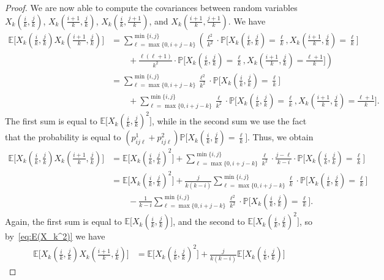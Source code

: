 \documentclass[10pt,a4paper]{amsart}
\newcommand{\EE}{\mathbb{E}}
\newcommand{\PP}{\mathbb{P}}
\begin{document}
\begin{proof}
We are now able to compute the covariances between random variables $X_k(\tfrac{i}{k},\tfrac{j}{k})$, $X_k(\tfrac{i+1}{k},\tfrac{j}{k})$, $X_k(\tfrac{i}{k},\tfrac{j+1}{k})$, and $X_k(\tfrac{i+1}{k},\tfrac{j+1}{k})$.
We have
\begin{align*}
    \EE\big[X_k(\tfrac{i}{k},\tfrac{j}{k})X_k(\tfrac{i+1}{k},\tfrac{j}{k})\big] &= \sum_{\ell=\max \{0,  i+j-k \}}^{\min \{i,j \}} \left(\frac{\ell^2}{k^2}\cdot \PP\big[X_k(\tfrac{i}{k},\tfrac{j}{k}) = \tfrac{\ell}{k}, X_k(\tfrac{i+1}{k},\tfrac{j}{k}) = \tfrac{\ell}{k}\big] \right.\\
    & \left.\qquad + \frac{\ell(\ell+1)}{k^2}\cdot \PP\big[X_k(\tfrac{i}{k},\tfrac{j}{k}) = \tfrac{\ell}{k}, X_k(\tfrac{i+1}{k},\tfrac{j}{k})= \tfrac{\ell+1}{k}\big]\right)\\
    &= \sum_{\ell=\max \{0,  i+j-k \}}^{\min \{i,j \}} \frac{\ell^2}{k^2}\cdot \PP\big[X_k(\tfrac{i}{k},\tfrac{j}{k}) = \tfrac{\ell}{k}\big] \\
    & \qquad + \sum_{\ell=\max \{0,  i+j-k \}}^{\min \{i,j \}} \frac{\ell}{k^2}\cdot \PP\big[X_k(\tfrac{i}{k},\tfrac{j}{k}) = \tfrac{\ell}{k}, X_k(\tfrac{i+1}{k},\tfrac{j}{k})= \tfrac{\ell+1}{k}\big].
\end{align*}
The first sum is equal to $\EE\big[X_k(\tfrac{i}{k},\tfrac{j}{k})^2\big]$, while in the second sum we use the fact that the probability is equal to $(p_{ij\ell}^1 + p_{ij\ell}^2)\PP\big[X_k(\tfrac{i}{k},\tfrac{j}{k}) = \tfrac{\ell}{k}\big]$.
Thus, we obtain
\begin{align*}
    \EE\big[X_k(\tfrac{i}{k},\tfrac{j}{k})X_k(\tfrac{i+1}{k},\tfrac{j}{k})\big] &= \EE\big[X_k(\tfrac{i}{k},\tfrac{j}{k})^2\big] + \sum_{\ell=\max \{0,  i+j-k \}}^{\min \{i,j \}} \frac{\ell}{k^2}\cdot \frac{j-\ell}{k-i}\cdot \PP\big[X_k(\tfrac{i}{k},\tfrac{j}{k}) = \tfrac{\ell}{k}\big]\\
    &= \EE\big[X_k(\tfrac{i}{k},\tfrac{j}{k})^2\big] + \frac{j}{k(k-i)}\sum_{\ell=\max \{0,  i+j-k \}}^{\min \{i,j \}} \frac{\ell}{k}\cdot \PP\big[X_k(\tfrac{i}{k},\tfrac{j}{k}) = \tfrac{\ell}{k}\big] \\
    & \qquad - \frac{1}{k-i}\sum_{\ell=\max \{0,  i+j-k \}}^{\min \{i,j \}} \frac{\ell^2}{k^2}\cdot \PP\big[X_k(\tfrac{i}{k},\tfrac{j}{k}) = \tfrac{\ell}{k}\big].
\end{align*}
Again, the first sum is equal to $\EE\big[X_k(\tfrac{i}{k},\tfrac{j}{k})\big]$, and the second to $\EE\big[X_k(\tfrac{i}{k},\tfrac{j}{k})^2\big]$, so by~\eqref{eq:E(X_k^2)} we have
\begin{align*}
    \EE\big[X_k(\tfrac{i}{k},\tfrac{j}{k})X_k(\tfrac{i+1}{k},\tfrac{j}{k})\big] &= \EE\big[X_k(\tfrac{i}{k},\tfrac{j}{k})^2\big] + \frac{j}{k(k-i)}\EE\big[X_k(\tfrac{i}{k},\tfrac{j}{k})\big]

\end{align*}
\end{proof}
\end{document}
